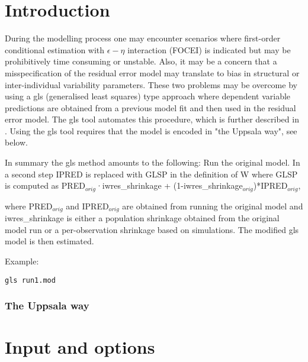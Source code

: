 
\usepackage{hyperref}


\maketitle
\newcommand{\guidetoolname}{gls}
\tableofcontents
\newpage

\section{Introduction}
During the modelling process one may encounter scenarios where first-order conditional estimation with $\epsilon - \eta$ 
interaction (FOCEI) is indicated but may be prohibitively time consuming or unstable. Also, it may be a concern that a misspecification 
of the residual error model may translate to bias in structural or inter-individual variability parameters. These two problems may be 
overcome by using a gls (generalised least squares) type approach where dependent variable predictions are obtained from a 
previous model fit and then used in the residual error model. The gls tool automates this procedure, which is further described 
in \cite{Ivaturi2}.
Using the gls tool requires that the model is encoded in "the Uppsala way", see below.

In summary the gls method amounts to the following: Run the original model. In a second step IPRED is replaced with GLSP in 
the definition of W where GLSP is computed as 
PRED$_{orig}$·iwres\_shrinkage + (1-iwres\_shrinkage$_{orig}$)*IPRED$_{orig}$, 

where  PRED$_{orig}$ and IPRED$_{orig}$ are obtained from running the original model and iwres\_shrinkage is either a population 
shrinkage obtained from the original model run or a per-observation shrinkage based on simulations.
The modified gls model is then estimated.

Example:
\begin{verbatim}
gls run1.mod
\end{verbatim}

\subsubsection*{The Uppsala way}


\section{Input and options}


